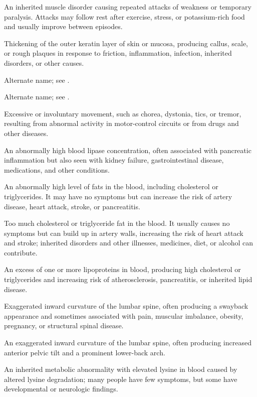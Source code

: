  An inherited muscle disorder causing repeated attacks of weakness or temporary paralysis. Attacks may follow rest after exercise, stress, or potassium-rich food and usually improve between episodes.

 Thickening of the outer keratin layer of skin or mucosa, producing callus, scale, or rough plaques in response to friction, inflammation, infection, inherited disorders, or other causes.

 Alternate name; see .

 Alternate name; see .

 Excessive or involuntary movement, such as chorea, dystonia, tics, or tremor, resulting from abnormal activity in motor-control circuits or from drugs and other diseases.

 An abnormally high blood lipase concentration, often associated with pancreatic inflammation but also seen with kidney failure, gastrointestinal disease, medications, and other conditions.

 An abnormally high level of fats in the blood, including cholesterol or triglycerides. It may have no symptoms but can increase the risk of artery disease, heart attack, stroke, or pancreatitis.

 Too much cholesterol or triglyceride fat in the blood. It usually causes no symptoms but can build up in artery walls, increasing the risk of heart attack and stroke; inherited disorders and other illnesses, medicines, diet, or alcohol can contribute.

 An excess of one or more lipoproteins in blood, producing high cholesterol or triglycerides and increasing risk of atherosclerosis, pancreatitis, or inherited lipid disease.

 Exaggerated inward curvature of the lumbar spine, often producing a swayback appearance and sometimes associated with pain, muscular imbalance, obesity, pregnancy, or structural spinal disease.

 An exaggerated inward curvature of the lumbar spine, often producing increased anterior pelvic tilt and a prominent lower-back arch.

 An inherited metabolic abnormality with elevated lysine in blood caused by altered lysine degradation; many people have few symptoms, but some have developmental or neurologic findings.

